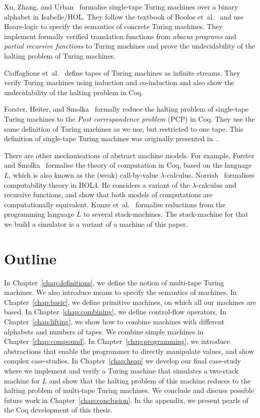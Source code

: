 Xu, Zhang, and Urban~\cite{xu2013} formalise single-tape Turing machines over a binary alphabet in Isabelle/HOL.  They follow the textbook of Boolos
et~al.~\cite{boolos2007computability} and use Hoare-logic to specify the semantics of concrete Turing machines.  They implement formally verified
translation functions from \textit{abacus programs} and \textit{partial recursive functions} to Turing machines and prove the undecidability of the
halting problem of Turing machines.

Ciaffaglione et~al.~\cite{ciaffaglione2016} define tapes of Turing machines as infinite streams.  They verify Turing machines using induction and
co-induction and also show the undecidability of the halting problem in Coq.

Forster, Heiter, and Smolka~\cite{forster2018verification} formally reduce the halting problem of single-tape Turing machines to the \textit{Post
  correspondence problem} (PCP) in Coq.  They use the same definition of Turing machines as we use, but restricted to one tape.  This definition of
single-tape Turing machines was originally presented in~\cite{asperti2012}.

There are other mechanisations of abstract machine models.  For example, Forster and Smolka~\cite{forster2017weak} formalise the theory of computation
in Coq, based on the language~$L$, which is also known as the (weak) call-by-value $\lambda$-calculus.  Norrish~\cite{norrish2011mechanised}
formalises computability theory in HOL4.  He considers a variant of the $\lambda$-calculus and recursive functions, and show that both models of
computations are computationally equivalent.  Kunze et~al.~\cite{KunzeEtAl:2018:Formal} formalise reductions from the programming language $L$ to
several stack-machines.  The stack-machine for that we build a simulator is a variant of a machine of this paper.



\section{Outline}
\label{sec:outline}

In Chapter~\ref{chap:definitions}, we define the notion of multi-tape Turing machines.  We also introduce means to specify the semantics of machines.
In Chapter~\ref{chap:basic}, we define primitive machines, on which all our machines are based.  In Chapter~\ref{chap:combining}, we define
control-flow operators.  In Chapter~\ref{chap:lifting}, we show how to combine machines with different alphabets and numbers of tapes.  We combine
simple machines in Chapter~\ref{chap:compound}.  In Chapter~\ref{chap:programming}, we introduce abstractions that enable the programmer to directly
manipulate values, and show complex case-studies.  In Chapter~\ref{chap:heap} we develop our final case-study where we implement and verify a Turing
machine that simulates a two-stack machine for $L$ and show that the halting problem of this machine reduces to the halting problem of multi-tape
Turing machines.  We conclude and discuss possible future work in Chapter~\ref{chap:conclusion}.  In the appendix, we present pearls of the Coq
development of this thesis.


